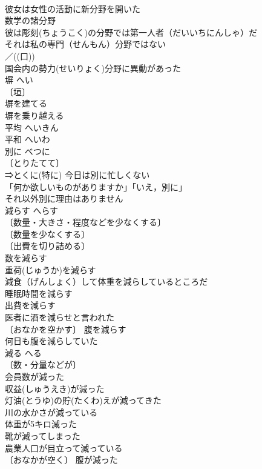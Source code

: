 \documentclass[8pt]{extreport}
\begin{document}
\begin{CJK}{UTF8}{min}
\\	彼女は女性の活動に新分野を開いた 
\\	数学の諸分野 
\\	彼は彫刻(ちょうこく)の分野では第一人者（だいいちにんしゃ）だ 
\\	それは私の専門（せんもん）分野ではない 
\\	／((口)) 
\\	国会内の勢力(せいりょく)分野に異動があった 
\\	塀	へい	
\\	〔垣〕
\\	塀を建てる 
\\	塀を乗り越える 
\\	平均	へいきん	
\\	平和	へいわ	
\\	別に	べつに	
\\	〔とりたてて〕
\\	⇒とくに(特に) 今日は別に忙しくない 
\\	「何か欲しいものがありますか」「いえ，別に」 
\\	それ以外別に理由はありません 
\\	減らす	へらす	
\\	〔数量・大きさ・程度などを少なくする〕
\\	〔数量を少なくする〕
\\	〔出費を切り詰める〕
\\	数を減らす 
\\	重荷(じゅうか)を減らす 
\\	減食（げんしょく）して体重を減らしているところだ 
\\	睡眠時間を減らす 
\\	出費を減らす 
\\	医者に酒を減らせと言われた 
\\	〔おなかを空かす〕 腹を減らす 
\\	何日も腹を減らしていた 
\\	減る	へる	
\\	〔数・分量などが〕
\\	会員数が減った 
\\	収益(しゅうえき)が減った 
\\	灯油(とうゆ)の貯(たくわ)えが減ってきた 
\\	川の水かさが減っている 
\\	体重が5キロ減った 
\\	靴が減ってしまった 
\\	農業人口が目立って減っている 
\\	〔おなかが空く〕 腹が減った 

\end{CJK}
\end{document}
